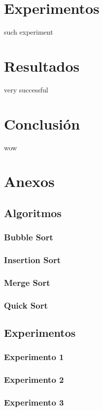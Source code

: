 \documentclass[11pt,letterpaper]{article}
\begin{document}
\newpage
\section{Experimentos}
such experiment

\newpage
\section{Resultados}
very successful

\newpage
\section{Conclusión}
wow




\newpage
\section{Anexos}

\subsection{Algoritmos}
\subsubsection{Bubble Sort}
\subsubsection{Insertion Sort}
\subsubsection{Merge Sort}
\subsubsection{Quick Sort}

\subsection{Experimentos}
\subsubsection{Experimento 1}
\subsubsection{Experimento 2}
\subsubsection{Experimento 3}
\end{document}
